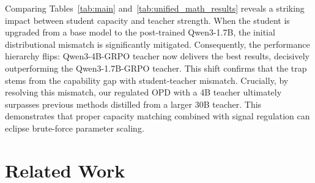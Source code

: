 \documentclass[11pt]{article}
\begin{document}
Comparing Tables~\ref{tab:main} and~\ref{tab:unified_math_results} reveals a striking impact between student capacity and teacher strength. 
When the student is upgraded from a base model to the post-trained {Qwen3-1.7B}, the initial distributional mismatch is significantly mitigated. 
{Consequently, the performance hierarchy flips:} {Qwen3-4B-GRPO} teacher now delivers the best results, decisively outperforming the {Qwen3-1.7B-GRPO} teacher. 
This shift confirms that the trap stems from the capability gap with student-teacher mismatch. 
{Crucially, by resolving this mismatch,} our regulated OPD with a 4B teacher ultimately surpasses previous methods distilled from a larger 30B teacher. 
This demonstrates that proper capacity matching combined with signal regulation can eclipse brute-force parameter scaling.

\section{Related Work}
\end{document}
